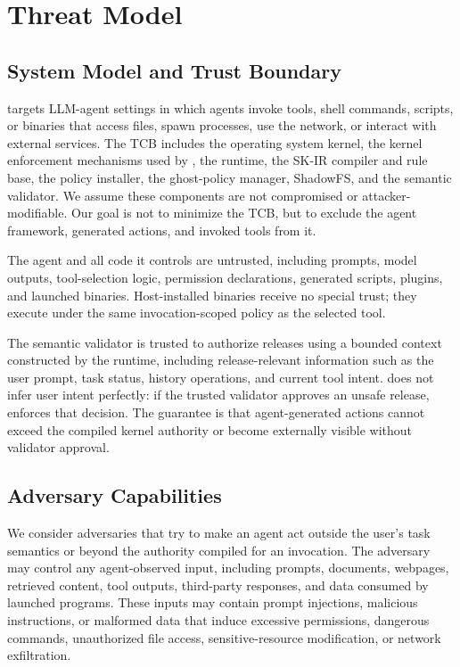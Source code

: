 \section{Threat Model}
\label{sec:threat}

\subsection{System Model and Trust Boundary}
\label{sec:threat:trust}

\SystemName targets LLM-agent settings in which agents invoke tools, shell
commands, scripts, or binaries that access files, spawn processes, use the
network, or interact with external services. The TCB includes the operating
system kernel, the kernel enforcement mechanisms used by \SystemName, the
\SystemName runtime, the SK-IR compiler and rule base, the policy installer, the
ghost-policy manager, ShadowFS, and the semantic validator. We assume these
components are not compromised or attacker-modifiable. Our goal is not to
minimize the TCB, but to exclude the agent framework, generated actions, and
invoked tools from it.

The agent and all code it controls are untrusted, including prompts, model
outputs, tool-selection logic, permission declarations, generated scripts,
plugins, and launched binaries. Host-installed binaries receive no special
trust; they execute under the same invocation-scoped policy as the selected tool.

The semantic validator is trusted to authorize releases using a bounded context
constructed by the runtime, including release-relevant information such as the
user prompt, task status, history operations, and current tool intent. \SystemName
does not infer user intent perfectly: if the trusted validator approves an unsafe
release, \SystemName enforces that decision. The guarantee is that
agent-generated actions cannot exceed the compiled kernel authority or become
externally visible without validator approval.

\subsection{Adversary Capabilities}
\label{sec:threat:adversary}

We consider adversaries that try to make an agent act outside the user's task
semantics or beyond the authority compiled for an invocation. The adversary may
control any agent-observed input, including prompts, documents, webpages,
retrieved content, tool outputs, third-party responses, and data consumed by
launched programs. These inputs may contain prompt injections, malicious
instructions, or malformed data that induce excessive permissions, dangerous
commands, unauthorized file access, sensitive-resource modification, or network
exfiltration.

